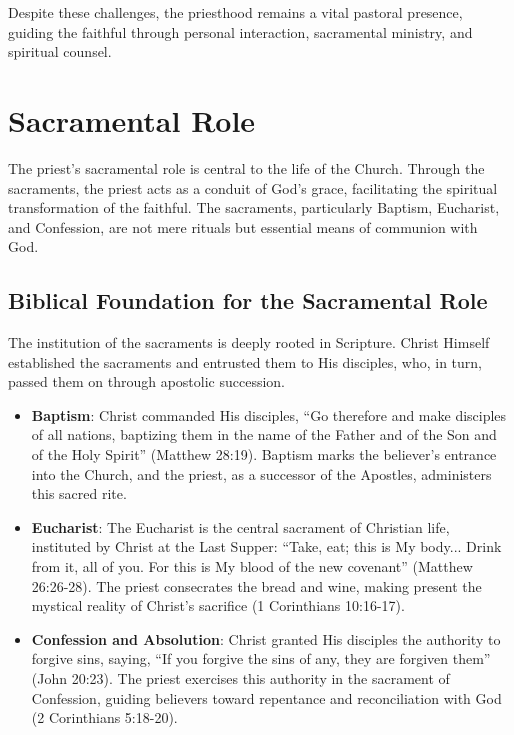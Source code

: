 \documentclass[12pt,doc]{apa7}   	%
\begin{document}
Despite these challenges, the priesthood remains a vital pastoral presence, guiding the faithful through personal interaction, sacramental ministry, and spiritual counsel.

\section{Sacramental Role}\label{sacramental}

The priest’s sacramental role is central to the life of the Church. Through the sacraments, the priest acts as a conduit of God’s grace, facilitating the spiritual transformation of the faithful. The sacraments, particularly Baptism, Eucharist, and Confession, are not mere rituals but essential means of communion with God.

\subsection{Biblical Foundation for the Sacramental Role}

The institution of the sacraments is deeply rooted in Scripture. Christ Himself established the sacraments and entrusted them to His disciples, who, in turn, passed them on through apostolic succession. 

\begin{itemize}
    \item \textbf{Baptism}: Christ commanded His disciples, ``Go therefore and make disciples of all nations, baptizing them in the name of the Father and of the Son and of the Holy Spirit'' (Matthew 28:19). Baptism marks the believer’s entrance into the Church, and the priest, as a successor of the Apostles, administers this sacred rite.
    
    \item \textbf{Eucharist}: The Eucharist is the central sacrament of Christian life, instituted by Christ at the Last Supper: ``Take, eat; this is My body... Drink from it, all of you. For this is My blood of the new covenant'' (Matthew 26:26-28). The priest consecrates the bread and wine, making present the mystical reality of Christ’s sacrifice (1 Corinthians 10:16-17).

    \item \textbf{Confession and Absolution}: Christ granted His disciples the authority to forgive sins, saying, ``If you forgive the sins of any, they are forgiven them'' (John 20:23). The priest exercises this authority in the sacrament of Confession, guiding believers toward repentance and reconciliation with God (2 Corinthians 5:18-20).
\end{itemize}
\end{document}
